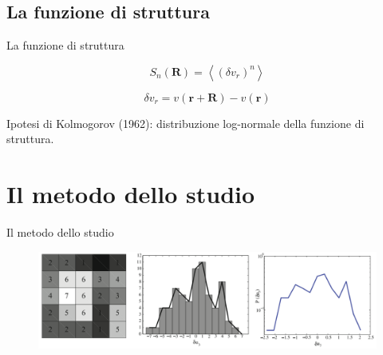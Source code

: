 \documentclass[11pt]{beamer}
\begin{document}
\subsection{La funzione di struttura}

\begin{frame}{La funzione di struttura}

\begin{equation}
S_n (\mathbf{R} ) =
\left\langle 
\left(
\delta v_r 
\right)^n
\right\rangle
\end{equation}

\begin{equation}
\delta v_r = v(\mathbf{r} + \mathbf{R}) - v(\mathbf{r})
\end{equation}

Ipotesi di Kolmogorov (1962): distribuzione log-normale della funzione di struttura.
\end{frame}

\section{Il metodo dello studio}

\begin{frame}{Il metodo dello studio}
\begin{figure}
\centering
\includegraphics[scale=0.22]{studio1.png}
\end{figure}
\end{frame}
\end{document}
